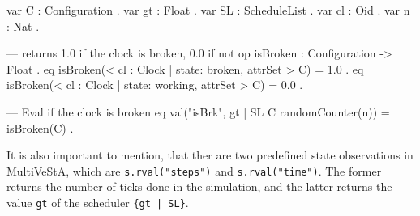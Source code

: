 \begin{itemize}
\begin{maude}
var C : Configuration .
var gt : Float .
var SL : ScheduleList .
var cl : Oid .
var n : Nat .

--- returns 1.0 if the clock is broken, 0.0 if not
op isBroken : Configuration -> Float .
eq isBroken(< cl : Clock | state: broken, attrSet > C) = 1.0 .
eq isBroken(< cl : Clock | state: working, attrSet > C) = 0.0 .

--- Eval if the clock is broken
eq val("isBrk", {gt | SL} {C randomCounter(n)}) = isBroken(C) .\end{maude}

It is also important to mention, that ther are two predefined state observations in MultiVeStA, which are \texttt{s.rval("steps")} and \texttt{s.rval("time")}. The former returns the number of ticks done in the simulation, and the latter returns the value \texttt{gt} of the scheduler \texttt{\{gt | SL\}}.
\end{itemize}

